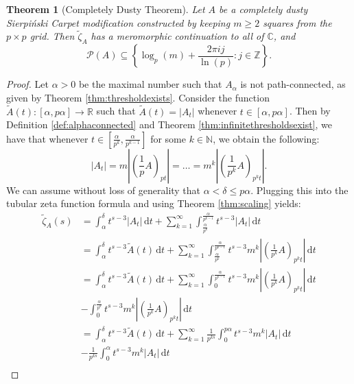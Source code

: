 \documentclass{article}
\theoremstyle{plain}
\newtheorem{theorem}{Theorem}
\numberwithin{equation}{section}
\numberwithin{table}{section}
\numberwithin{figure}{section}
\begin{document}
\begin{theorem}[Completely Dusty Theorem] \label{thm:alphaconnected}
Let $A$ be a completely dusty Sierpi\'nski Carpet modification constructed by keeping $m \geq 2$ squares from the $p \times p$ grid. Then $\tilde{\zeta}_A$ has a meromorphic continuation to all of $\mathbb{C}$, and
\begin{equation}
\mathscr{P}(A) \subseteq \left\{\log_p(m) + \frac{2\pi i j}{\ln(p)}: j \in \mathbb{Z}\right\}.
\end{equation}
\end{theorem}
\begin{proof}
Let $\alpha > 0$ be the maximal number such that $A_{\alpha}$ is not path-connected, as given by Theorem \ref{thm:thresholdexists}. Consider the function $\tilde{A}(t) : [\alpha, p\alpha] \rightarrow \mathbb{R}$ such that $\tilde{A}(t) = |A_t|$ whenever $t \in [\alpha,p\alpha]$. Then by Definition \ref{def:alphaconnected} and Theorem \ref{thm:infinitethresholdsexist}, we have that whenever $t \in \left[\frac{\alpha}{p^k}, \frac{\alpha}{p^{k-1}}\right]$ for some $k \in \mathbb{N}$, we obtain the following:
\begin{equation}
|A_t| = m \left|\left(\frac{1}{p} A\right)_{p t}\right| =\dots= m^k \left|\left(\frac{1}{p^k} A\right)_{p^k t}\right|.
\end{equation}
We can assume without loss of generality that $\alpha < \delta \leq p\alpha$. Plugging this into the tubular zeta function formula and using Theorem \ref{thm:scaling} yields:
\begin{align}
\tilde{\zeta}_A(s)
&= \int_{\alpha}^{\delta} t^{s-3} |A_t| \,\mathrm{d}t + \sum_{k=1}^{\infty} \int_{\frac{\alpha}{p^k}}^{\frac{\alpha}{p^{k-1}}} t^{s-3} |A_t| \,\mathrm{d}t \\
&= \int_{\alpha}^{\delta} t^{s-3} \tilde{A}(t) \,\mathrm{d}t + \sum_{k=1}^{\infty} \int_{\frac{\alpha}{p^k}}^{\frac{\alpha}{p^{k-1}}} t^{s-3} m^k \left|\left(\frac{1}{p^k} A\right)_{p^k t}\right| \,\mathrm{d}t\\
&= \int_{\alpha}^{\delta} t^{s-3} \tilde{A}(t) \,\mathrm{d}t + \sum_{k=1}^{\infty} \int_0^{\frac{\alpha}{p^{k-1}}} t^{s-3} m^k \left|\left(\frac{1}{p^k} A\right)_{p^k t}\right| \,\mathrm{d}t \nonumber\\&- \int_0^{\frac{\alpha}{p^k}} t^{s-3} m^k \left|\left(\frac{1}{p^k} A\right)_{p^k t}\right| \,\mathrm{d}t \\
&= \int_{\alpha}^{\delta} t^{s-3} \tilde{A}(t) \,\mathrm{d}t + \sum_{k=1}^{\infty} \frac{1}{p^{k s}} \int_0^{p\alpha} t^{s-3} m^k \left|A_t\right| \,\mathrm{d}t \nonumber\\&- \frac{1}{p^{k s}} \int_0^{\alpha} t^{s-3} m^k \left|A_t\right| \,\mathrm{d}t\\

\end{align}
\end{proof}
\end{document}
